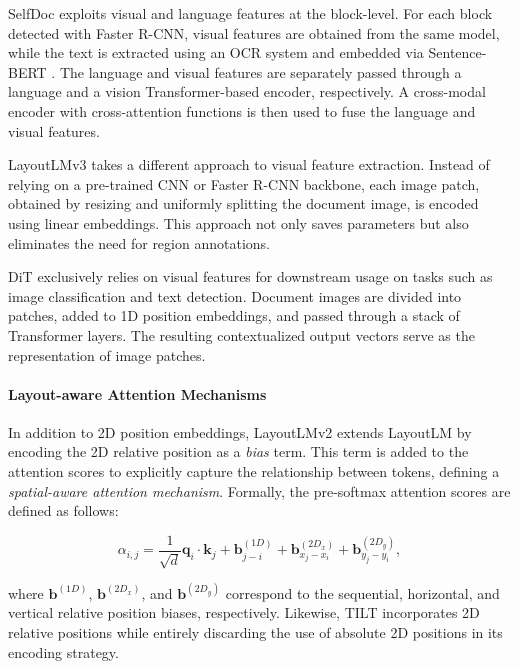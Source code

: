 SelfDoc \citep{li2021selfdoc} exploits visual and language features at the block-level. For each block detected with Faster R-CNN, visual features are obtained from the same model, while the text is extracted using an \ac{OCR} system and embedded via Sentence-BERT \citep{reimers2019sentence}. The language and visual features are separately passed through a language and a vision Transformer-based encoder, respectively. A cross-modal encoder with cross-attention functions is then used to fuse the language and visual features.  

LayoutLMv3 \citep{huang2022layoutlmv3} takes a different approach to visual feature extraction. Instead of relying on a pre-trained \ac{CNN} or Faster R-CNN backbone, each image patch, obtained by resizing and uniformly splitting the document image, is encoded using linear embeddings. This approach not only saves parameters but also eliminates the need for region annotations.

\ac{DiT} \citep{li2022dit} exclusively relies on visual features for downstream usage on tasks such as image classification and text detection. Document images are divided into patches, added to 1D position embeddings, and passed through a stack of Transformer layers. The resulting contextualized output vectors serve as the representation of image patches.

\paragraph{Layout-aware Attention Mechanisms}

In addition to 2D position embeddings, LayoutLMv2 \citep{xu2020layoutlmv2} extends LayoutLM by encoding the 2D relative position as a \textit{bias} term. This term is added to the attention scores to explicitly capture the relationship between tokens, defining a \textit{spatial-aware attention mechanism}. Formally, the pre-softmax attention scores are defined as follows:

\begin{equation}
    \alpha_{i,j} = \dfrac{1}{\sqrt{d}} \bm{q}_i \cdot \bm{k}_j + \bm{b}^{(1D)}_{j - i} + \bm{b}^{(2D_x)}_{x_j - x_i} + \bm{b}^{(2D_y)}_{y_j - y_i},
\end{equation}

\noindent where $\bm{b}^{(1D)}$, $\bm{b}^{(2D_x)}$, and $\bm{b}^{(2D_y)}$ correspond to the sequential, horizontal, and vertical relative position biases, respectively. Likewise, TILT \citep{powalski2021going} incorporates 2D relative positions while entirely discarding the use of absolute 2D positions in its encoding strategy. 

